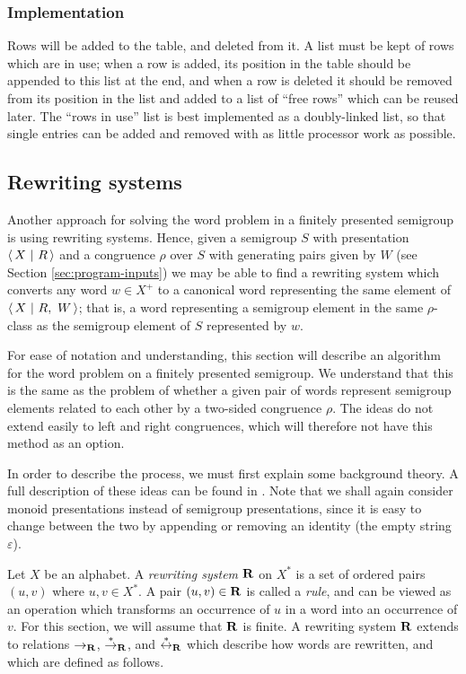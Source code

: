 \subsubsection{Implementation}

Rows will be added to the table, and deleted from it.  A list must be kept of
rows which are in use; when a row is added, its position in the table should be
appended to this list at the end, and when a row is deleted it should be removed
from its position in the list and added to a list of ``free rows'' which can be
reused later.  The ``rows in use'' list is best implemented as a doubly-linked
list, so that single entries can be added and removed with as little processor
work as possible.

\subsection{Rewriting systems}
\label{sec:kb}

Another approach for solving the word problem in a finitely presented semigroup
is using rewriting systems.  Hence, given a semigroup $S$ with presentation
$\left\langle\,X ~\middle|~ R\,\right\rangle$ and a congruence $\rho$ over $S$ with generating pairs given by $W$
(see Section \ref{sec:program-inputs})
we may be able to find a rewriting system which converts any word $w \in X^+$ to
a canonical word representing the same element of $\left\langle\,X ~\middle|~ R,\ W\,\right\rangle$;
that is, a word representing a semigroup element in the same $\rho$-class as
the semigroup element of $S$ represented by $w$.

For ease of notation and understanding, this section will describe an algorithm
for the word problem on a finitely presented semigroup.  We understand that this
is the same as the problem of whether a given pair of words represent semigroup
elements related to each other by a two-sided congruence $\rho$.  The ideas do
not extend easily to left and right congruences, which will therefore not have
this method as an option.

In order
to describe the process, we must first explain some background theory.  A full
description of these ideas can be found in \cite[Section 12.2]{cgt}.  Note that
we shall again consider monoid presentations instead of semigroup presentations,
since it is easy to change between the two by appending or removing an identity
(the empty string $\varepsilon$).

Let $X$ be an alphabet.  A \textit{rewriting system} $\mathbf{R}$ on $X^*$ is a
set of ordered pairs $(u,v)$ where $u, v \in X^*$.
A pair $(u,v) \in \mathbf{R}$ is called a \textit{rule}, and can be viewed as
an operation which transforms an occurrence of $u$ in a word into an occurrence
of $v$.
For this section, we will assume that $\mathbf{R}$ is finite.
A rewriting system $\mathbf{R}$ extends to relations
$\to_{\mathbf{R}}$, $\stackrel{*}{\to}_{\mathbf{R}}$, and $\stackrel{*}{\leftrightarrow}_{\mathbf{R}}$
which describe how words are rewritten, and which are defined as follows.

